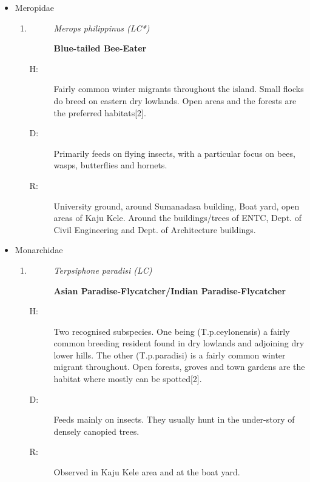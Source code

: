 \begin{itemize}
\begin{enumerate}
\begin{description}
\item[R: ]%
Observed in Ceremonial courtyard, Kaju Kele and "Thummulla" area.%
\end{description}%
\end{enumerate}%
\item%
Meropidae%
\begin{enumerate}%
\item%
\begin{description}%
\item[]%
\textit{Merops philippinus (LC*)}%
\item[]%
\textbf{Blue{-}tailed Bee{-}Eater}%
\end{description}%
\begin{description}%
\item[H: ]%
Fairly common winter migrants throughout the island. Small flocks do breed on eastern dry lowlands. Open areas and the forests are the preferred habitats{[}2{]}.%
\item[D: ]%
Primarily feeds on flying insects, with a particular focus on bees, wasps, butterflies and hornets. %
\item[R: ]%
University ground, around Sumanadasa building, Boat yard, open areas of Kaju Kele. Around the buildings/trees of  ENTC,  Dept. of Civil Engineering and Dept. of Architecture buildings.%
\end{description}%
\end{enumerate}%
\newpage
\item%
Monarchidae%
\begin{enumerate}%
\item%
\begin{description}%
\item[]%
\textit{Terpsiphone paradisi (LC)}%
\item[]%
\textbf{Asian Paradise{-}Flycatcher/Indian Paradise{-}Flycatcher}%
\end{description}%
\begin{description}%
\item[H: ]%
Two recognised subspecies. One being (T.p.ceylonensis) a fairly common breeding resident found in dry lowlands and adjoining dry lower hills. The other (T.p.paradisi) is a fairly common winter migrant throughout. Open forests, groves and town gardens are the habitat where mostly can be spotted{[}2{]}.%
\item[D: ]%
Feeds mainly on insects.  They usually hunt in the under-story of densely canopied trees.%
\item[R: ]%
Observed in Kaju Kele area and at the boat yard.%

\end{description}
\end{enumerate}
\end{itemize}
